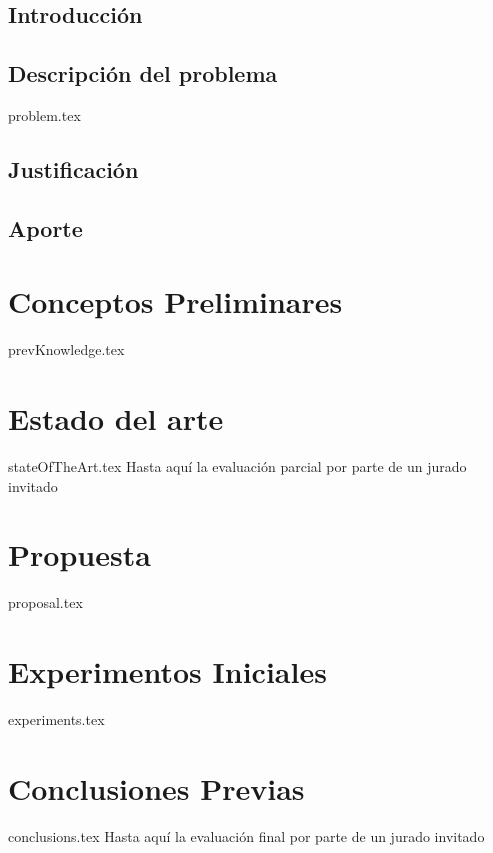 \documentclass{report}
\begin{document}
\section{Introducción}
\section{Descripción del problema}
{problem.tex}

\section{Justificación}


\section{Aporte}

\chapter{Conceptos Preliminares}
{prevKnowledge.tex}

\chapter{Estado del arte}
{stateOfTheArt.tex}
\hline
\LARGE
Hasta aquí la evaluación parcial por parte de un jurado invitado

\hline 

\chapter{Propuesta}
{proposal.tex}

\chapter{Experimentos Iniciales}
{experiments.tex}

\chapter{Conclusiones Previas}
{conclusions.tex}
\hline 
\LARGE
Hasta aquí la evaluación final  por parte de un jurado invitado

\hline 



\end{document}
